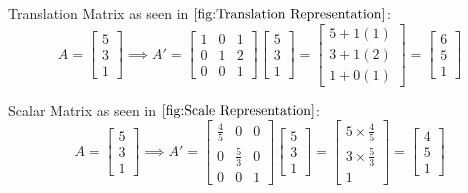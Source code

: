 \documentclass[
    12pt,
    twoside,
    bibstyle=chicago,
    headerstyle=uppercase,
	bibfile=thesis.bib
]{reedthesis}
\begin{document}

Translation Matrix as seen in $\ref{fig:Translation Representation}$:
\[A = \begin{bmatrix}5\\3\\1\end{bmatrix} \implies A' = \begin{bmatrix}1&0&1\\0&1&2\\0&0&1\end{bmatrix}\begin{bmatrix}5\\3\\1\end{bmatrix} = \begin{bmatrix}5 + 1(1)\\3 + 1(2)\\1 + 0(1)\end{bmatrix}= \begin{bmatrix}6\\5\\1\end{bmatrix}\]

Scalar Matrix as seen in $\ref{fig:Scale Representation}$:
\[A = \begin{bmatrix}5\\3\\1\end{bmatrix} \implies A' = \begin{bmatrix}\frac{4}{5}&0&0\\0&\frac{5}{3}&0\\0&0&1\end{bmatrix}\begin{bmatrix}5\\3\\1\end{bmatrix} = \begin{bmatrix}5 \times \frac{4}{5}\\3 \times \frac{5}{3}\\1\end{bmatrix}= \begin{bmatrix}4\\5\\1\end{bmatrix}\]
\end{document}
